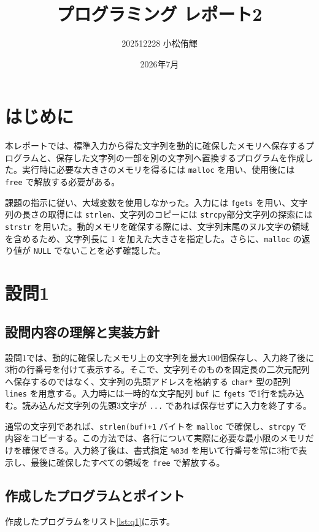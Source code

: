 \documentclass[lualatex,paper=a4paper,fontsize=10pt]{jlreq}
\title{プログラミング レポート2}
\author{202512228 小松侑輝}
\date{2026年7月}
\begin{document}
\maketitle

\section{はじめに}
本レポートでは、標準入力から得た文字列を動的に確保したメモリへ保存するプログラムと、保存した文字列の一部を別の文字列へ置換するプログラムを作成した。実行時に必要な大きさのメモリを得るには \texttt{malloc} を用い、使用後には \texttt{free} で解放する必要がある。

課題の指示に従い、大域変数を使用しなかった。入力には \texttt{fgets} を用い、文字列の長さの取得には \texttt{strlen}、文字列のコピーには \texttt{strcpy}部分文字列の探索には \texttt{strstr} を用いた。動的メモリを確保する際には、文字列末尾のヌル文字の領域を含めるため、文字列長に 1 を加えた大きさを指定した。さらに、\texttt{malloc} の返り値が \texttt{NULL} でないことを必ず確認した。

\section{設問1}
\subsection{設問内容の理解と実装方針}
設問1では、動的に確保したメモリ上の文字列を最大100個保存し、入力終了後に3桁の行番号を付けて表示する。そこで、文字列そのものを固定長の二次元配列へ保存するのではなく、文字列の先頭アドレスを格納する \texttt{char*} 型の配列 \texttt{lines} を用意する。入力時には一時的な文字配列 \texttt{buf} に \texttt{fgets} で1行を読み込む。読み込んだ文字列の先頭3文字が \texttt{...} であれば保存せずに入力を終了する。

通常の文字列であれば、\texttt{strlen(buf)+1} バイトを \texttt{malloc} で確保し、\texttt{strcpy} で内容をコピーする。この方法では、各行について実際に必要な最小限のメモリだけを確保できる。入力終了後は、書式指定 \texttt{\%03d} を用いて行番号を常に3桁で表示し、最後に確保したすべての領域を \texttt{free} で解放する。

\subsection{作成したプログラムとポイント}
作成したプログラムをリスト\ref{lst:q1}に示す。


\end{document}
